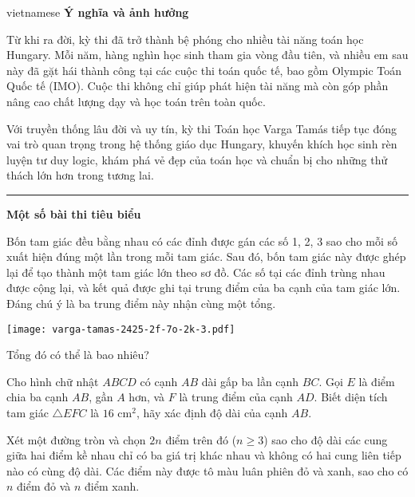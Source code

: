 \documentclass{article}
\begin{document}
\begin{otherlanguage*}{vietnamese}
\textbf{Ý nghĩa và ảnh hưởng}

Từ khi ra đời, kỳ thi đã trở thành bệ phóng cho nhiều tài năng toán học Hungary. Mỗi năm, hàng nghìn học sinh tham gia vòng đầu tiên,
và nhiều em sau này đã gặt hái thành công tại các cuộc thi toán quốc tế, bao gồm Olympic Toán Quốc tế (IMO).
Cuộc thi không chỉ giúp phát hiện tài năng mà còn góp phần nâng cao chất lượng dạy và học toán trên toàn quốc.

Với truyền thống lâu đời và uy tín, kỳ thi Toán học Varga Tamás tiếp tục đóng vai trò quan trọng trong hệ thống giáo dục Hungary,
khuyến khích học sinh rèn luyện tư duy logic, khám phá vẻ đẹp của toán học và chuẩn bị cho những thử thách lớn hơn trong tương lai.

\bigbreak

\noindent\rule{16.5cm}{0.4pt}

\textbf{Một số bài thi tiêu biểu}

\bigbreak

\begin{problem*}
    Bốn tam giác đều bằng nhau có các đỉnh được gán các số 1, 2, 3 sao cho mỗi số xuất hiện đúng một lần trong mỗi tam giác.
    Sau đó, bốn tam giác này được ghép lại để tạo thành một tam giác lớn theo sơ đồ.
    Các số tại các đỉnh trùng nhau được cộng lại, và kết quả được ghi tại trung điểm của ba cạnh của tam giác lớn. Đáng chú ý là ba trung điểm này nhận cùng một tổng.
    \begin{center}
        \texttt{[image: varga-tamas-2425-2f-7o-2k-3.pdf]}
    \end{center}
    Tổng đó có thể là bao nhiêu?
\end{problem*}

\begin{problem*}
    Cho hình chữ nhật \( ABCD \) có cạnh \( AB \) dài gấp ba lần cạnh \( BC \). Gọi \( E \) là điểm chia ba cạnh \( AB \), gần \( A \) hơn, và \( F \) là trung điểm của cạnh \( AD \).
    Biết diện tích tam giác \( \triangle EFC \) là \( 16 \) cm\(^2\), hãy xác định độ dài của cạnh \( AB \).
\end{problem*}

\begin{problem*}
    Xét một đường tròn và chọn \( 2n \) điểm trên đó (\( n \geq 3 \)) sao cho độ dài các cung giữa hai điểm kề nhau chỉ có ba giá trị khác nhau
    và không có hai cung liên tiếp nào có cùng độ dài. Các điểm này được tô màu luân phiên đỏ và xanh, sao cho có \( n \) điểm đỏ và \( n \) điểm xanh.  
    

\end{problem*}
\end{otherlanguage*}
\end{document}
